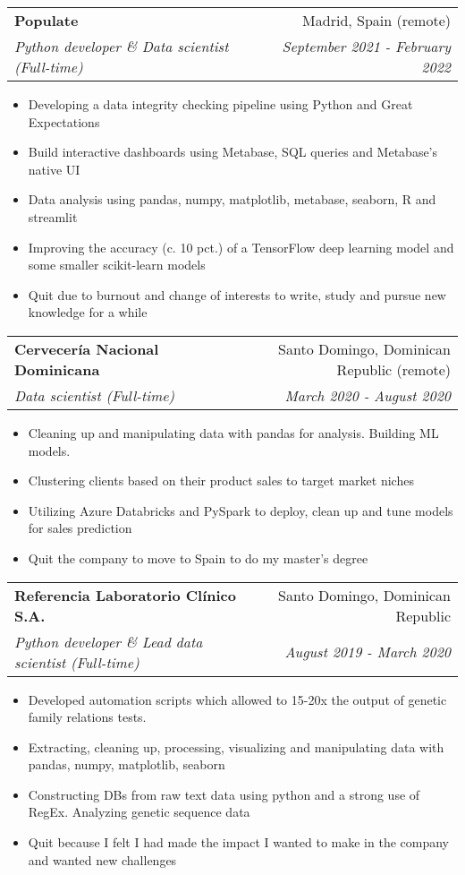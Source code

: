 \documentclass[a4paper,20pt]{article}
\makeatletter
\newcommand{\resumeSubheading}[4]{
  \vspace{-1pt}\item
    \begin{tabular*}{0.97\textwidth}{l@{\extracolsep{\fill}}r}
      \textbf{#1} & #2 \\
      \textit{#3} & \textit{#4} \\
    \end{tabular*}\vspace{-5pt}
}
\makeatother
\begin{document}
\vspace{-2pt}
  \resumeSubheading{Populate}{Madrid, Spain (remote)}
    {Python developer \& Data scientist (Full-time)}{September 2021 - February 2022}
\begin{itemize} \itemsep-0.24em
  \item Developing a data integrity checking pipeline using Python and Great Expectations
  \item Build interactive dashboards using Metabase, SQL queries and Metabase's native UI
  \item Data analysis using pandas, numpy, matplotlib, metabase, seaborn, R and streamlit
  \item Improving the accuracy (c. 10 pct.) of a TensorFlow deep learning model and some smaller scikit-learn models
  \item Quit due to burnout and change of interests to write, study and pursue new knowledge for a while
\end{itemize}
\vspace{-2pt}
  \resumeSubheading{Cervecería Nacional Dominicana}{Santo Domingo, Dominican Republic (remote)}
    {Data scientist (Full-time)}{March 2020 - August 2020}
\begin{itemize} \itemsep-0.24em
  \item Cleaning up and manipulating data with pandas for analysis. Building ML models.
  \item Clustering clients based on their product sales to target market niches
  \item Utilizing Azure Databricks and PySpark to deploy, clean up and tune models for sales prediction
  \item Quit the company to move to Spain to do my master's degree
\end{itemize}
\vspace{-2pt}
  \resumeSubheading{Referencia Laboratorio Clínico S.A.}{Santo Domingo, Dominican Republic}
    {Python developer \& Lead data scientist (Full-time)}{August 2019 - March 2020}
\begin{itemize} \itemsep-0.24em
  \item Developed automation scripts which allowed to 15-20x the output of genetic family relations tests.
  \item Extracting, cleaning up, processing, visualizing and manipulating data with pandas, numpy, matplotlib, seaborn
  \item Constructing DBs from raw text data using python and a strong use of RegEx. Analyzing genetic sequence data
  \item Quit because I felt I had made the impact I wanted to make in the company and wanted new challenges
\end{itemize}
\end{document}
